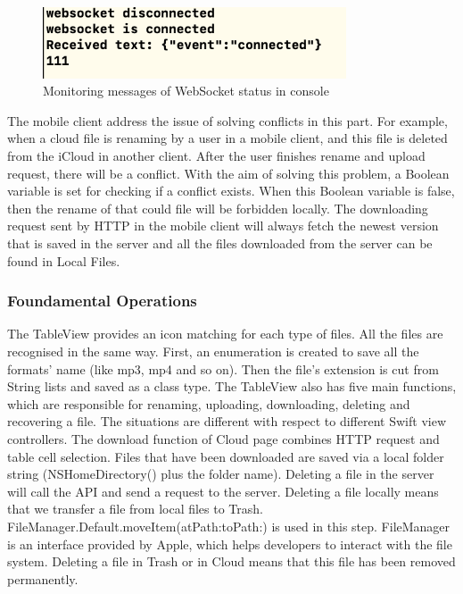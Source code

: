 \documentclass{article}
\begin{document}
\begin{figure}[H]
\begin{center}
\includegraphics[width=9cm]{36.png}
\end{center}
\caption{Monitoring messages of WebSocket status in console}\label{ex011}
\end{figure}

The mobile client address the issue of solving conflicts in this part. For example, when a cloud file is renaming by a user in a mobile client, and this file is deleted from the iCloud in another client. After the user finishes rename and upload request, there will be a conflict. With the aim of solving this problem, a Boolean variable is set for checking if a conflict exists. When this Boolean variable is false, then the rename of that could file will be forbidden locally. The downloading request sent by HTTP in the mobile client will always fetch the newest version that is saved in the server and all the files downloaded from the server can be found in Local Files. 

\subsubsection{Foundamental Operations}

The TableView provides an icon matching for each type of files. All the files are recognised in the same way. First, an enumeration is created to save all the formats' name (like mp3, mp4 and so on). Then the file's extension is cut from String lists and saved as a class type. The TableView also has five main functions, which are responsible for renaming, uploading, downloading, deleting and recovering a file. The situations are different with respect to different Swift view controllers. The download function of Cloud page combines HTTP request and table cell selection. Files that have been downloaded are saved via a local folder string (NSHomeDirectory() plus the folder name). Deleting a file in the server will call the API and send a request to the server. Deleting a file locally means that we transfer a file from local files to Trash. FileManager.Default.moveItem(atPath:toPath:) is used in this step. FileManager is an interface provided by Apple, which helps developers to interact with the file system. Deleting a file in Trash or in Cloud means that this file has been removed permanently. 
\end{document}
